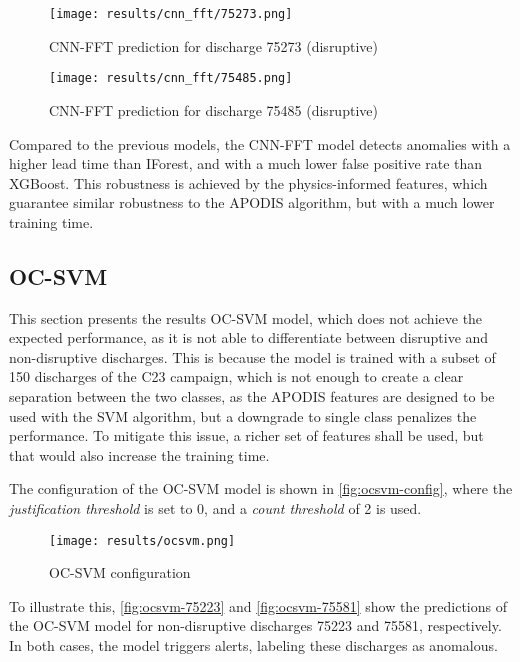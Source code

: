 \begin{figure}[H]
    \centering
    \texttt{[image: results/cnn\_fft/75273.png]}
    \caption{CNN-FFT prediction for discharge 75273 (disruptive)}
    \label{fig:cnn-fft-75273}
\end{figure}

\begin{figure}[H]
    \centering
    \texttt{[image: results/cnn\_fft/75485.png]}
    \caption{CNN-FFT prediction for discharge 75485 (disruptive)}
    \label{fig:cnn-fft-75485}
\end{figure}

Compared to the previous models, the CNN-FFT model detects anomalies with a higher lead time than \ac{IForest}, and with a much lower false positive rate than XGBoost. This robustness is achieved by the physics-informed features, which guarantee similar robustness to the \ac{APODIS} algorithm, but with a much lower training time.

\subsection{\acs{OC-SVM}}

This section presents the results \ac{OC-SVM} model, which does not achieve the expected performance, as it is not able to differentiate between disruptive and non-disruptive discharges. This is because the model is trained with a subset of 150 discharges of the C23 campaign, which is not enough to create a clear separation between the two classes, as the \ac{APODIS} features are designed to be used with the \ac{SVM} algorithm, but a downgrade to single class penalizes the performance. To mitigate this issue, a richer set of features shall be used, but that would also increase the training time.

The configuration of the \ac{OC-SVM} model is shown in \autoref{fig:ocsvm-config}, where the \textit{justification threshold} is set to 0, and a \textit{count threshold} of 2 is used.

\begin{figure}[H]
    \centering
    \texttt{[image: results/ocsvm.png]}
    \caption{\ac{OC-SVM} configuration}
    \label{fig:ocsvm-config}
\end{figure}

To illustrate this, \autoref{fig:ocsvm-75223} and \autoref{fig:ocsvm-75581} show the predictions of the \ac{OC-SVM} model for non-disruptive discharges 75223 and 75581, respectively. In both cases, the model triggers alerts, labeling these discharges as anomalous.

